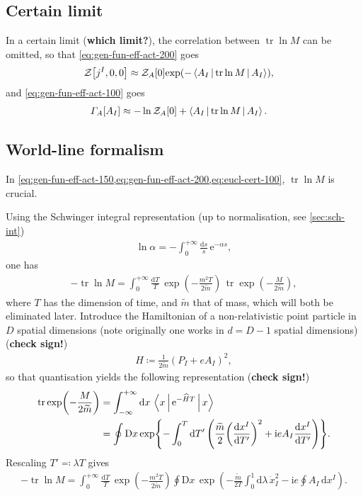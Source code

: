 \documentclass[12pt]{article}
\newcommand\mi{\mathrm{i}} %
\newcommand\me{\mathrm{e}} %
\newcommand\dif{\mathrm{d}}
\newcommand\Dif{\mathrm{D}}
\DeclareMathOperator{\tr}{tr}
\newcommand{\rbr}[1]{{\left(#1\right)}}
\newcommand{\rfun}[2]{{#1}\mathopen{}\left(#2\right)\mathclose{}}
\newcommand{\sfun}[2]{{#1}\mathopen{}\left[#2\right]\mathclose{}}
\newcommand{\cfun}[2]{{#1}\mathopen{}\left\{#2\right\}\mathclose{}}
\newcommand{\frde}[2]{{\frac{\dif{#1}}{\dif{#2}}}}
\begin{document}
\subsection{Certain limit}
\label{ssec:eucl-cert}
In a certain limit (\textbf{which limit?}), the correlation between $\tr \ln M$ 
can be omitted, so that \cref{eq:gen-fun-eff-act-200} goes
\begin{align}
\sfun{\mathcal{Z}}{j^I, 0, 0} &\approx
\sfun{\mathcal{Z}_{A}}{0}
	\rfun{\exp}{-\Braket{A_I | \tr\ln M | A_I}},
\end{align}
and \cref{eq:gen-fun-eff-act-100} goes
\begin{align}
\sfun{\varGamma_A}{A_I} &\approx -\ln \sfun{\mathcal{Z}_{A}}{0}
	+ \Braket{A_I | \tr\ln M | A_I}.
\label{eq:eucl-cert-100}
\end{align}


\subsection{World-line formalism}
\label{ssec:eucl-wlfm}

In \cref{eq:gen-fun-eff-act-150,eq:gen-fun-eff-act-200,eq:eucl-cert-100}, 
$\tr\ln M$ is crucial.

Using the Schwinger integral representation \cite{Schwinger1951} (up to 
normalisation, see \cref{sec:sch-int})
\begin{align}
\ln \alpha = -\int_0^{+\infty} \frac{\dif s}{s}\,\me^{-\alpha s},
\end{align}
one has
\begin{align}
- \tr\ln M = \int_0^{+\infty} \frac{\dif T}{T}\,
	\rfun{\exp}{-\frac{m^2 T}{2\widetilde{m}}}\,
	\tr \rfun{\exp}{-\frac{M}{2\widetilde{m}}},
\end{align}
where $T$ has the dimension of time, and $\widetilde{m}$ that of mass, which 
will both be eliminated later. Introduce the Hamiltonian of a non-relativistic 
point particle in $D$ spatial dimensions (note originally one works in $d = 
D-1$ spatial dimensions) (\textbf{check sign!})
\begin{align}
H \coloneqq \frac{1}{2 \widetilde{m}} \rbr{P_I + e A_I}^2,
\end{align}
so that quantisation yields the following representation (\textbf{check sign!})
\begin{align}
\tr \rfun{\exp}{-\frac{M}{2\widetilde{m}}} &= \int_{-\infty}^{+\infty}\dif x\,
\Braket{x | \me^{-\widehat{H} T} | x}
\\
&= \oint \Dif x\,\cfun{\exp}{-\int_{0}^{T}\dif T'\,
	\rbr{\frac{\widetilde{m}}{2} \rbr{\frde{x^I}{T'}}^2 +
	\mi e A_I \frde{x^I}{T'}}}.
\label{eq:eucl-wlfm-050}
\end{align}
Rescaling $T' \eqqcolon \lambda T$ gives
\begin{align}
- \tr\ln M = \int_{0}^{+\infty} \frac{\dif T}{T}\,
	\rfun{\exp}{-\frac{m^2 T}{2 \widetilde{m}}}
	\oint \Dif x\,
		\rfun{\exp}{-\frac{\widetilde{m}}{2T} \int_{0}^{1} \dif \lambda\, 
			\dot{x}_I^2 - \mi e \oint A_I\,\dif x^I}.
\label{eq:eucl-wlfm-100}
\end{align}
\end{document}
